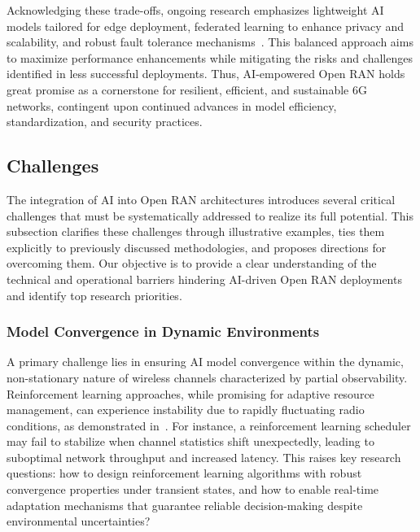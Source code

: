\documentclass[sigconf]{acmart}
\begin{document}
Acknowledging these trade-offs, ongoing research emphasizes lightweight AI models tailored for edge deployment, federated learning to enhance privacy and scalability, and robust fault tolerance mechanisms~\cite{ref54}. This balanced approach aims to maximize performance enhancements while mitigating the risks and challenges identified in less successful deployments. Thus, AI-empowered Open RAN holds great promise as a cornerstone for resilient, efficient, and sustainable 6G networks, contingent upon continued advances in model efficiency, standardization, and security practices.

\subsection{Challenges}
The integration of AI into Open RAN architectures introduces several critical challenges that must be systematically addressed to realize its full potential. This subsection clarifies these challenges through illustrative examples, ties them explicitly to previously discussed methodologies, and proposes directions for overcoming them. Our objective is to provide a clear understanding of the technical and operational barriers hindering AI-driven Open RAN deployments and identify top research priorities.

\subsubsection{Model Convergence in Dynamic Environments}
A primary challenge lies in ensuring AI model convergence within the dynamic, non-stationary nature of wireless channels characterized by partial observability. Reinforcement learning approaches, while promising for adaptive resource management, can experience instability due to rapidly fluctuating radio conditions, as demonstrated in~\cite{ref54}. For instance, a reinforcement learning scheduler may fail to stabilize when channel statistics shift unexpectedly, leading to suboptimal network throughput and increased latency. This raises key research questions: how to design reinforcement learning algorithms with robust convergence properties under transient states, and how to enable real-time adaptation mechanisms that guarantee reliable decision-making despite environmental uncertainties?
\end{document}
